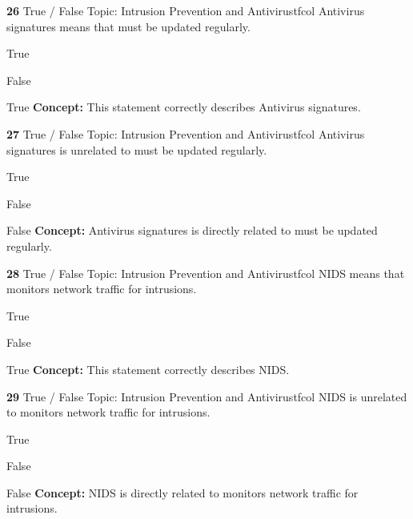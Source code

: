 \documentclass[10pt,a4paper]{article}
\begin{document}
\begin{qcard}{\color{white}\textbf{26} \hfill \small True / False \textbar{} Topic: Intrusion Prevention and Antivirus}{tfcol}
Antivirus signatures means that must be updated regularly.

\begin{qoptions}
\item True
\item False
\end{qoptions}
\begin{explainbox}{True}
\textbf{Concept:} This statement correctly describes Antivirus signatures.
\end{explainbox}
\end{qcard}

\begin{qcard}{\color{white}\textbf{27} \hfill \small True / False \textbar{} Topic: Intrusion Prevention and Antivirus}{tfcol}
Antivirus signatures is unrelated to must be updated regularly.

\begin{qoptions}
\item True
\item False
\end{qoptions}
\begin{explainbox}{False}
\textbf{Concept:} Antivirus signatures is directly related to must be updated regularly.
\end{explainbox}
\end{qcard}

\begin{qcard}{\color{white}\textbf{28} \hfill \small True / False \textbar{} Topic: Intrusion Prevention and Antivirus}{tfcol}
NIDS means that monitors network traffic for intrusions.

\begin{qoptions}
\item True
\item False
\end{qoptions}
\begin{explainbox}{True}
\textbf{Concept:} This statement correctly describes NIDS.
\end{explainbox}
\end{qcard}

\begin{qcard}{\color{white}\textbf{29} \hfill \small True / False \textbar{} Topic: Intrusion Prevention and Antivirus}{tfcol}
NIDS is unrelated to monitors network traffic for intrusions.

\begin{qoptions}
\item True
\item False
\end{qoptions}
\begin{explainbox}{False}
\textbf{Concept:} NIDS is directly related to monitors network traffic for intrusions.
\end{explainbox}
\end{qcard}
\end{document}
